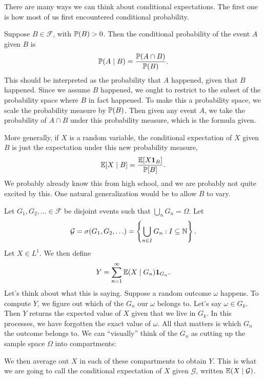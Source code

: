 \documentclass[a4paper]{article}
\begin{document}
There are many ways we can think about conditional expectations. The first one is how most of us first encountered conditional probability.

Suppose $B \in \mathcal{F}$, with $\P(B) > 0$. Then the conditional probability of the event $A$ given $B$ is
\[
  \P(A \mid B) = \frac{\P(A \cap B)}{\P(B)}.
\]
This should be interpreted as the probability that $A$ happened, given that $B$ happened. Since we assume $B$ happened, we ought to restrict to the subset of the probability space where $B$ in fact happened. To make this a probability space, we scale the probability measure by $\P(B)$. Then given any event $A$, we take the probability of $A \cap B$ under this probability measure, which is the formula given.

More generally, if $X$ is a random variable, the conditional expectation of $X$ given $B$ is just the expectation under this new probability measure,
\[
  \E[X \mid B] = \frac{\E[X \mathbf{1}_B]}{\P[B]}.
\]
We probably already know this from high school, and we are probably not quite excited by this. One natural generalization would be to allow $B$ to vary.

Let $G_1, G_2, \ldots \in \mathcal{F}$ be disjoint events such that $\bigcup_n G_n = \Omega$. Let
\[
  \mathcal{G} = \sigma(G_1, G_2, \ldots) = \left\{\bigcup_{n \in I} G_n: I \subseteq \N\right\}. %
\]
Let $X \in L^1$. We then define
\[
  Y = \sum_{n = 1}^\infty \E(X \mid G_n) \mathbf{1}_{G_n}.
\]
Let's think about what this is saying. Suppose a random outcome $\omega$ happens. To compute $Y$, we figure out which of the $G_n$ our $\omega$ belongs to. Let's say $\omega \in G_k$. Then $Y$ returns the expected value of $X$ given that we live in $G_k$. In this processes, we have forgotten the exact value of $\omega$. All that matters is which $G_n$ the outcome belongs to. We can ``visually'' think of the $G_n$ as cutting up the sample space $\Omega$ into compartments:
\begin{center}
\end{center}
We then average out $X$ in each of these compartments to obtain $Y$. This is what we are going to call the conditional expectation of $X$ given $\mathcal{G}$, written $\E(X \mid \mathcal{G})$.
\end{document}
